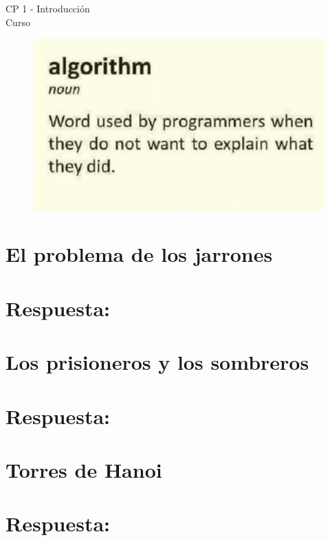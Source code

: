 \begin{center}
    \begin{large}
    CP 1 - Introducción\\
    Curso \academicyear\\
    \end{large}
    
    \begin{figure}[h]
    	\centering
    	\includegraphics[width=0.5\linewidth]{cp1/algorithm.png}
    \end{figure}
\end{center}

\section{El problema de los jarrones}


\ifshowanswers
\section*{Respuesta:}

\fi

\section{Los prisioneros y los sombreros}


\ifshowanswers
\section*{Respuesta:}

\fi

\section{Torres de Hanoi}


\ifshowanswers
\section*{Respuesta:}

\fi

